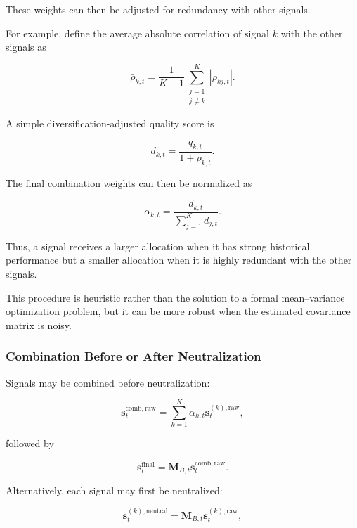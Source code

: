 \documentclass[11pt,a4paper]{article}
\begin{document}
These weights can then be adjusted for redundancy with other signals.

For example, define the average absolute correlation of signal $k$ with the
other signals as

\begin{equation}
\boxed{
\bar{\rho}_{k,t}
=
\frac{1}{K-1}
\sum_{\substack{j=1\\j\neq k}}^{K}
\left|
\rho_{kj,t}
\right|.
}
\end{equation}

A simple diversification-adjusted quality score is

\begin{equation}
\boxed{
d_{k,t}
=
\frac{
q_{k,t}
}{
1+\bar{\rho}_{k,t}
}.
}
\end{equation}

The final combination weights can then be normalized as

\begin{equation}
\boxed{
\alpha_{k,t}
=
\frac{
d_{k,t}
}{
\sum_{j=1}^{K}d_{j,t}
}.
}
\end{equation}

Thus, a signal receives a larger allocation when it has strong historical
performance but a smaller allocation when it is highly redundant with the
other signals.

This procedure is heuristic rather than the solution to a formal
mean--variance optimization problem, but it can be more robust when the
estimated covariance matrix is noisy.


\subsubsection{Combination Before or After Neutralization}

Signals may be combined before neutralization:

\begin{equation}
\mathbf{s}_t^{\mathrm{comb,raw}}
=
\sum_{k=1}^{K}
\alpha_{k,t}
\mathbf{s}_t^{(k),\mathrm{raw}},
\end{equation}

followed by

\begin{equation}
\mathbf{s}_t^{\mathrm{final}}
=
\mathbf{M}_{B,t}
\mathbf{s}_t^{\mathrm{comb,raw}}.
\end{equation}

Alternatively, each signal may first be neutralized:

\begin{equation}
\mathbf{s}_t^{(k),\mathrm{neutral}}
=
\mathbf{M}_{B,t}
\mathbf{s}_t^{(k),\mathrm{raw}},
\end{equation}
\end{document}
